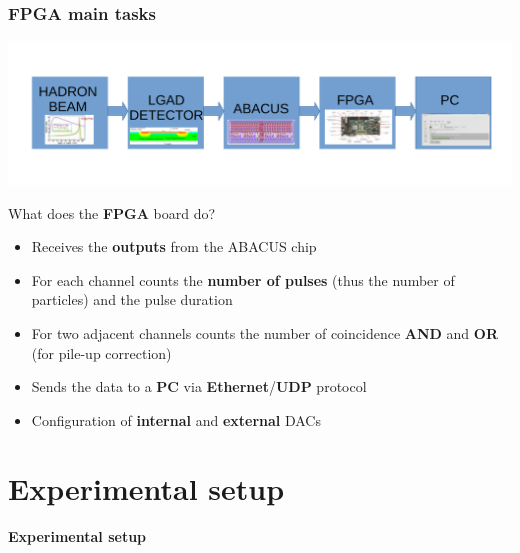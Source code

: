 \documentclass[aspectratio=169]{beamer}
\begin{document}
\begin{frame}
	\frametitle{FPGA main tasks}
	\vspace*{-2.7mm}
	\begin{center}
		\includegraphics[width=0.85 \textwidth]{IMG/Block_Diagram.pdf}
	\end{center}
	\vspace*{-5mm}
	\begin{center}
		{\Large \color{blue} What does the \textbf{FPGA} board do?}\\[3mm]
		\begin{itemize}
			\item Receives the \textbf{outputs} from the ABACUS chip
			\item For each channel counts the \textbf{number of pulses} (thus the number of particles) and the pulse duration
			\item For two adjacent channels counts the number of coincidence \textbf{AND} and \textbf{OR} (for pile-up correction)
			\item Sends the data to a \textbf{PC} via \textbf{Ethernet}/\textbf{UDP} protocol
			\item Configuration of \textbf{internal} and \textbf{external} DACs
		\end{itemize}
	\end{center}
\end{frame}

	
\section{Experimental setup}

\begin{frame}
\begin{center}
	{\Huge {}\selectfont \color{blue} \textbf{Experimental setup}}
\end{center}
\end{frame}
\end{document}
